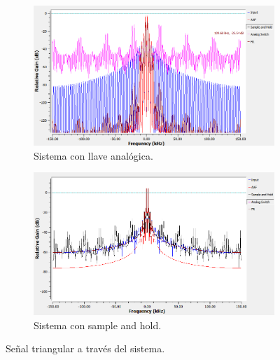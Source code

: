 \begin{figure}[H]
		\begin{subfigure}{.5\textwidth}
	\centering
	\includegraphics[width=\textwidth]{SimulacionesGNURADIO/Condiciones_optimas/TRIANGULAR_FFT_LLAVE_BC.PNG}
	\caption{Sistema con llave analógica.}		
	\end{subfigure}
	\begin{subfigure}{.5\textwidth}
	\centering
	\includegraphics[width=\textwidth]{SimulacionesGNURADIO/Condiciones_optimas/TRIANGULAR_FFT_SAMPLE_AND_HOLD_BC.PNG}
	\caption{Sistema con sample and hold.}		
	\end{subfigure}
	
	\caption{Señal triangular a través del sistema.}
\end{figure}


